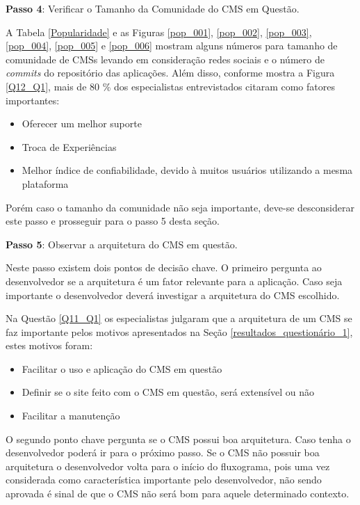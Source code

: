 \textbf{Passo 4}: Verificar o Tamanho da Comunidade do CMS em Questão.

A Tabela \ref{Popularidade} e as Figuras \ref{pop_001}, \ref{pop_002}, \ref{pop_003}, \ref{pop_004}, \ref{pop_005} e \ref{pop_006} mostram alguns números para tamanho de comunidade de CMSs levando em consideração redes sociais e o número de \textit{commits} do repositório das aplicações. Além disso, conforme mostra a Figura \ref{Q12_Q1}, mais de 80 \% dos especialistas entrevistados citaram como fatores importantes: 

\begin{itemize}
\item Oferecer um melhor suporte
\item Troca de Experiências
\item Melhor índice de confiabilidade, devido à muitos usuários utilizando a mesma plataforma

\end{itemize} 

Porém caso o tamanho da comunidade não seja importante, deve-se desconsiderar este passo e prosseguir para o passo 5 desta seção.

\textbf{Passo 5}: Observar a arquitetura do CMS em questão.

Neste passo existem dois pontos de decisão chave. O primeiro pergunta ao desenvolvedor se a arquitetura é um fator relevante para a aplicação. Caso seja importante o desenvolvedor deverá investigar a arquitetura do CMS escolhido.

Na Questão \ref{Q11_Q1} os especialistas julgaram que a arquitetura de um CMS se faz importante pelos  motivos apresentados na Seção \ref{resultados_questionário_1}, estes motivos foram:

\begin{itemize}

\item Facilitar o uso e aplicação do CMS em questão
\item Definir se o site feito com o CMS em questão, será extensível ou não
\item Facilitar a manutenção 

\end{itemize}

O segundo ponto chave pergunta se o CMS possui boa arquitetura. Caso tenha o desenvolvedor poderá ir para o próximo passo. Se o CMS não possuir boa arquitetura o desenvolvedor volta para o início do fluxograma, pois uma vez considerada como característica importante pelo desenvolvedor, não sendo aprovada é sinal de que o CMS não será bom para aquele determinado contexto.

